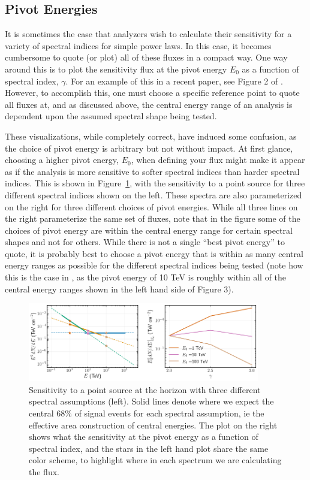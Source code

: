 \documentclass[a4paper,11pt]{article}
\begin{document}
\subsection{Pivot Energies}
\label{subsec:pivot}
It is sometimes the case that analyzers wish to calculate their sensitivity for a variety of spectral indices for simple power laws. In this case, it becomes cumbersome to quote (or plot) all of these fluxes in a compact way. One way around this is to plot the sensitivity flux at the pivot energy $E_0$ as a function of spectral index, $\gamma$. For an example of this in a recent paper, see Figure 2 of \cite{ICECUBE:2021edr}. However, to accomplish this, one must choose a specific reference point to quote all fluxes at, and as discussed above, the central energy range of an analysis is dependent upon the assumed spectral shape being tested. 

These visualizations, while completely correct, have induced some confusion, as the choice of pivot energy is arbitrary but not without impact. At first glance, choosing a higher pivot energy, $E_0$, when defining your flux might make it appear as if the analysis is more sensitive to softer spectral indices than harder spectral indices. This is shown in Figure~\ref{fig:pivot_energies}, with the sensitivity to a point source for three different spectral indices shown on the left. These spectra are also parameterized on the right for three different choices of pivot energies. While all three lines on the right parameterize the same set of fluxes, note that in the figure some of the choices of pivot energy are within the central energy range for certain spectral shapes and not for others. While there is not a single ``best pivot energy'' to quote, it is probably best to choose a pivot energy that is within as many central energy ranges as possible for the different spectral indices being tested (note how this is the case in \cite{ICECUBE:2021edr}, as the pivot energy of 10 TeV is roughly within all of the central energy ranges shown in the left hand side of Figure 3).

\begin{figure}
    \centering
    \includegraphics[width=0.90\textwidth]{figures/pivot_energies.png}
    \caption{Sensitivity to a point source at the horizon with three different spectral assumptions (left). Solid lines denote where we expect the central 68\% of signal events for each spectral assumption, ie the effective area construction of central energies. The plot on the right shows what the sensitivity at the pivot energy as a function of spectral index, and the stars in the left hand plot share the same color scheme, to highlight where in each spectrum we are calculating the flux.}
    \label{fig:pivot_energies}
\end{figure}
\end{document}
